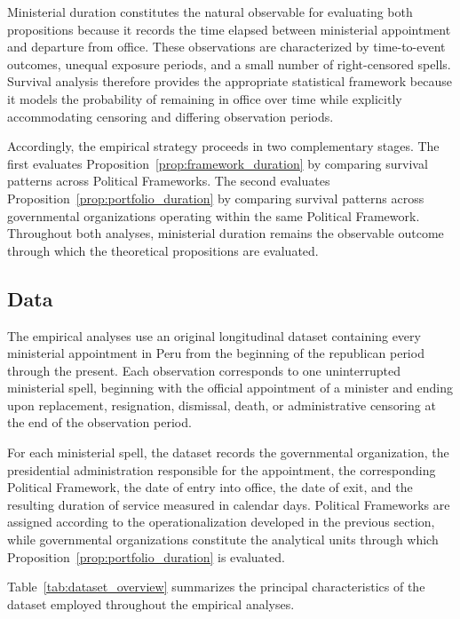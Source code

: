\documentclass[doc, 12pt, a4paper,floatsintext]{apa7}
\begin{document}
Ministerial duration constitutes the natural observable for evaluating both propositions because it records the time elapsed between ministerial appointment and departure from office. These observations are characterized by time-to-event outcomes, unequal exposure periods, and a small number of right-censored spells. Survival analysis therefore provides the appropriate statistical framework because it models the probability of remaining in office over time while explicitly accommodating censoring and differing observation periods.

Accordingly, the empirical strategy proceeds in two complementary stages. The first evaluates Proposition~\ref{prop:framework_duration} by comparing survival patterns across Political Frameworks. The second evaluates Proposition~\ref{prop:portfolio_duration} by comparing survival patterns across governmental organizations operating within the same Political Framework. Throughout both analyses, ministerial duration remains the observable outcome through which the theoretical propositions are evaluated.
\subsection{Data}
%
The empirical analyses use an original longitudinal dataset containing every ministerial appointment in Peru from the beginning of the republican period through the present. Each observation corresponds to one uninterrupted ministerial spell, beginning with the official appointment of a minister and ending upon replacement, resignation, dismissal, death, or administrative censoring at the end of the observation period.



For each ministerial spell, the dataset records the governmental organization, the presidential administration responsible for the appointment, the corresponding Political Framework, the date of entry into office, the date of exit, and the resulting duration of service measured in calendar days. Political Frameworks are assigned according to the operationalization developed in the previous section, while governmental organizations constitute the analytical units through which Proposition~\ref{prop:portfolio_duration} is evaluated.

Table~\ref{tab:dataset_overview} summarizes the principal characteristics of the dataset employed throughout the empirical analyses.
\end{document}
